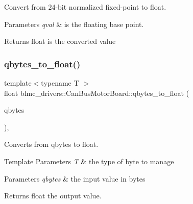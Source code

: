 Convert from 24-\/bit normalized fixed-\/point to float. 


\begin{DoxyParams}{Parameters}
{\em qval} & is the floating base point. \\
\hline
\end{DoxyParams}
\begin{DoxyReturn}{Returns}
float is the converted value 
\end{DoxyReturn}
\mbox{\label{classblmc__drivers_1_1CanBusMotorBoard_ad2cee731d455d64d71014c9821219410}} 
\subsubsection{\texorpdfstring{qbytes\+\_\+to\+\_\+float()}{qbytes\_to\_float()}}
{\footnotesize\ttfamily template$<$typename T $>$ \\
float blmc\+\_\+drivers\+::\+Can\+Bus\+Motor\+Board\+::qbytes\+\_\+to\+\_\+float (\begin{DoxyParamCaption}\item[{T}]{qbytes }\end{DoxyParamCaption})\hspace{0.3cm}{\ttfamily [inline]}, {\ttfamily [private]}}



Converts from qbytes to float. 


\begin{DoxyTemplParams}{Template Parameters}
{\em T} & the type of byte to manage \\
\hline
\end{DoxyTemplParams}

\begin{DoxyParams}{Parameters}
{\em qbytes} & the input value in bytes \\
\hline
\end{DoxyParams}
\begin{DoxyReturn}{Returns}
float the output value. 
\end{DoxyReturn}
\mbox{\label{classblmc__drivers_1_1CanBusMotorBoard_a5ec842674fd543a8c834265433740387}} 
